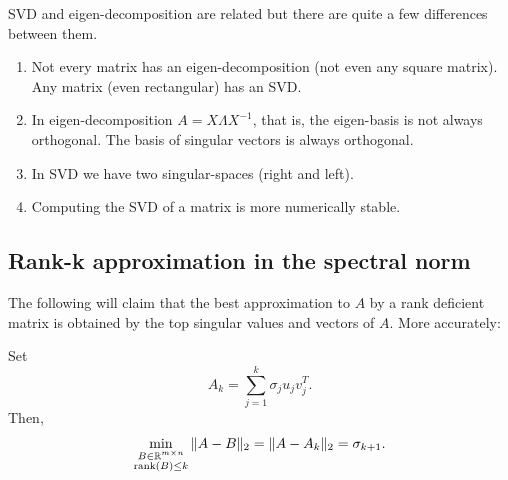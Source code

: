 \documentclass{article}
\begin{document}
\noindent SVD and eigen-decomposition are related but there are quite a few differences between them.
\begin{enumerate}
\item Not every matrix has an eigen-decomposition (not even any
square matrix).  Any matrix (even rectangular) has an SVD.
\item In eigen-decomposition $A=X \Lambda X^{-1}$, that is, the
eigen-basis is not always orthogonal. The basis of singular vectors
is always orthogonal.
\item In SVD we have two singular-spaces (right and left).
\item Computing the SVD of a matrix is more numerically stable.
\end{enumerate}




\subsection*{Rank-k approximation in the spectral norm}
The following will claim that the best approximation to $A$ by a rank deficient 
matrix is obtained by the top singular values and vectors of $A$. More accurately:
\begin{fact}
Set
\begin{equation*}
A_{k} = \sum_{j=1}^{k} \sigma_{j} u_{j} v_{j}^{T}.
\end{equation*}
Then,
\begin{equation*}
\min_{\substack{B \in \mathbb{R}^{m \times n} \\
\operatorname{rank}(B) \leq k}} \| A-B \|_{2} = \| A-A_{k} \|_{2}
= \sigma_{k+1}.
\end{equation*}
\end{fact}
\end{document}
